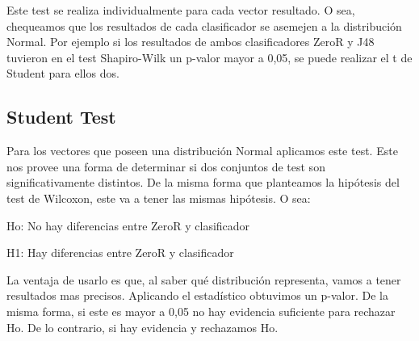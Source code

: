 Este test se realiza individualmente para cada vector resultado. O sea, chequeamos que los resultados de cada clasificador se asemejen a la distribución Normal. Por ejemplo si los resultados de ambos clasificadores ZeroR y J48 tuvieron en el test Shapiro-Wilk un p-valor mayor a 0,05, se puede realizar el t de Student para ellos dos. 

\subsection{Student Test}



Para los vectores que poseen una distribución Normal aplicamos este test. Este nos provee una forma de determinar si dos conjuntos de test son significativamente distintos. De la misma forma que planteamos la hipótesis del test de Wilcoxon, este va a tener las mismas hipótesis. O sea: 

\vspace{0.5cm}
\hspace{2cm}Ho: No hay diferencias entre ZeroR y clasificador
\vspace{0.25cm}

\hspace{2cm}H1: Hay diferencias entre ZeroR y clasificador
\vspace{0.5cm}

La ventaja de usarlo es que, al saber qué distribución representa, vamos a tener resultados mas precisos. Aplicando el estadístico obtuvimos un p-valor. De la misma forma, si este es mayor a 0,05 no hay evidencia suficiente para rechazar Ho. De lo contrario, si hay evidencia y rechazamos Ho.


